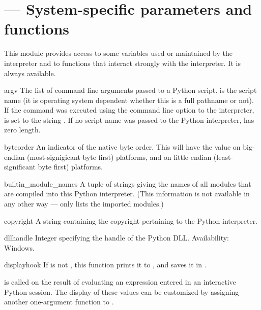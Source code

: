 \section{ ---
         System-specific parameters and functions}


This module provides access to some variables used or maintained by the
interpreter and to functions that interact strongly with the interpreter.
It is always available.


\begin{datadesc}{argv}
  The list of command line arguments passed to a Python script.
   is the script name (it is operating system dependent
  whether this is a full pathname or not).  If the command was
  executed using the  command line option to the
  interpreter,  is set to the string .  If no
  script name was passed to the Python interpreter,  has
  zero length.
\end{datadesc}

\begin{datadesc}{byteorder}
  An indicator of the native byte order.  This will have the value
   on big-endian (most-signigicant byte first) platforms,
  and  on little-endian (least-significant byte first)
  platforms.
\end{datadesc}

\begin{datadesc}{builtin_module_names}
  A tuple of strings giving the names of all modules that are compiled
  into this Python interpreter.  (This information is not available in
  any other way ---  only lists the imported
  modules.)
\end{datadesc}

\begin{datadesc}{copyright}
  A string containing the copyright pertaining to the Python
  interpreter.
\end{datadesc}

\begin{datadesc}{dllhandle}
  Integer specifying the handle of the Python DLL.
  Availability: Windows.
\end{datadesc}

\begin{funcdesc}{displayhook}{}
  If  is not , this function prints it to
  , and saves it in .

   is called on the result of evaluating an
  expression entered in an interactive Python session.  The display of
  these values can be customized by assigning another one-argument
  function to .
\end{funcdesc}

